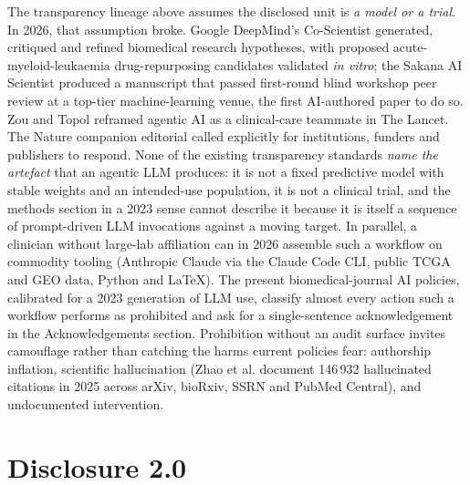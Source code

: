 \documentclass[11pt,a4paper]{article}
\begin{document}
The transparency lineage above assumes the disclosed unit is \emph{a model or a trial}. In 2026, that assumption broke. Google DeepMind's Co-Scientist\citep{coscientist2026} generated, critiqued and refined biomedical research hypotheses, with proposed acute-myeloid-leukaemia drug-repurposing candidates validated \textit{in vitro}; the Sakana AI Scientist\citep{luSakana2026} produced a manuscript that passed first-round blind workshop peer review at a top-tier machine-learning venue, the first AI-authored paper to do so. Zou and Topol\citep{zouAgentic2025} reframed agentic AI as a clinical-care teammate in The Lancet. The Nature companion editorial\citep{natureEditorial2026} called explicitly for institutions, funders and publishers to respond. None of the existing transparency standards \emph{name the artefact} that an agentic LLM produces: it is not a fixed predictive model with stable weights and an intended-use population, it is not a clinical trial, and the methods section in a 2023 sense cannot describe it because it is itself a sequence of prompt-driven LLM invocations against a moving target. In parallel, a clinician without large-lab affiliation can in 2026 assemble such a workflow on commodity tooling (Anthropic Claude via the Claude Code CLI, public TCGA and GEO data, Python and LaTeX). The present biomedical-journal AI policies, calibrated for a 2023 generation of LLM use\citep{lancetaipolicy2024}, classify almost every action such a workflow performs as prohibited and ask for a single-sentence acknowledgement in the Acknowledgements section. Prohibition without an audit surface invites camouflage rather than catching the harms current policies fear: authorship inflation, scientific hallucination (Zhao et al.\citep{zhaoHallucinations2026} document 146\,932 hallucinated citations in 2025 across arXiv, bioRxiv, SSRN and PubMed Central), and undocumented intervention.

\section{Disclosure 2.0}
\end{document}
